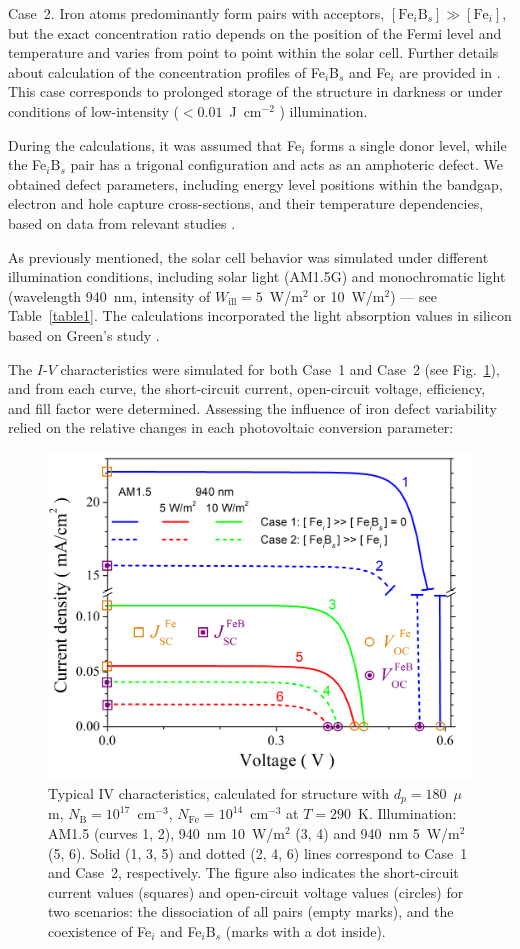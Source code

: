\documentclass[a4paper,fleqn]{cas-sc}
\begin{document}
Case~2.
Iron atoms predominantly form pairs with acceptors, $\left[\mathrm{Fe}_i\mathrm{B}_s\right] \gg \left[\mathrm{Fe}_i\right]$,
but the exact concentration ratio depends on the position of the Fermi level and temperature \cite{FeB:kinetic,MurphyJAP2011}
and varies from point to point within the solar cell.
Further details about calculation of the concentration profiles of Fe$_i$B$_s$ and Fe$_i$ are provided in \cite{Olikh2022PPV,Olikh2019SM}.
This case corresponds to prolonged storage of the structure in darkness or under conditions of low-intensity ($< 0.01$~J~cm$^{-2}$ \cite{Macdonald2004}) illumination.


During the calculations, it was assumed that Fe$_i$ forms a single donor level,
while the Fe$_i$B$_s$ pair has a trigonal configuration and acts as an amphoteric defect.
We obtained defect parameters, including energy level positions within the bandgap, electron and hole capture cross-sections, and their temperature dependencies,
based on data from relevant studies \cite{ROUGIEUX2018,Istratov1999,Paudyal}.

As previously mentioned, the solar cell behavior was simulated under different illumination conditions,
including solar light (AM1.5G) and monochromatic light (wavelength 940~nm, intensity of $W_\mathrm{ill} = 5$~W/m$^{2}$ or 10~W/m$^{2}$) --- see Table~\ref{table1}.
The calculations incorporated the light absorption values in silicon based on Green's study \cite{Green2022}.


The $I$-$V$ characteristics were simulated for both Case~1 and Case~2 (see Fig.~\ref{fig2}),
and from each curve, the short-circuit current, open-circuit voltage, efficiency, and fill factor were determined.
Assessing the influence of iron defect variability relied on the relative changes in each photovoltaic conversion parameter:

\begin{figure}
	\centering
		\includegraphics[width=0.5\linewidth]{Fig2.png}
	  \caption{Typical IV characteristics,
   calculated for structure with $d_p = 180$~$\mu$m, $N_\mathrm{B}=10^{17}$~cm$^{-3}$,
   $N_\mathrm{Fe}=10^{14}$~cm$^{-3}$ at $T = 290$~K.
   Illumination: AM1.5 (curves 1, 2), 940~nm 10~W/m$^{2}$ (3, 4) and 940~nm 5~W/m$^{2}$ (5, 6).
   Solid (1, 3, 5) and dotted (2, 4, 6) lines correspond to Case~1 and Case~2, respectively.
   The figure also indicates the short-circuit current values (squares)
   and open-circuit voltage values (circles) for two scenarios:
   the dissociation of all pairs (empty marks), and the coexistence of Fe$_i$ and Fe$_i$B$_s$ (marks with a dot inside).}\label{fig2}
\end{figure}
\end{document}
